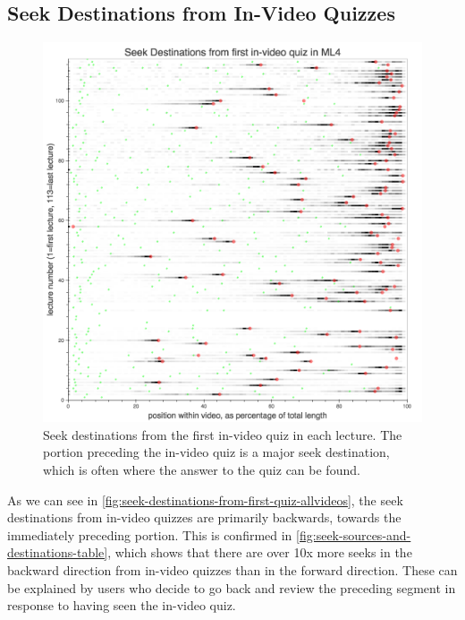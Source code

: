 \documentclass{sigchi}
\begin{document}
\pagebreak

\subsection{Seek Destinations from In-Video Quizzes}

\begin{figure}
\includegraphics[width=1.0\columnwidth]{seek-destinations-from-first-quiz-allvideos}
\caption{Seek destinations from the first in-video quiz in each lecture. The portion preceding the in-video quiz is a major seek destination, which is often where the answer to the quiz can be found.}
\label{fig:seek-destinations-from-first-quiz-allvideos}
\end{figure}

As we can see in \autoref{fig:seek-destinations-from-first-quiz-allvideos}, the seek destinations from in-video quizzes are primarily backwards, towards the immediately preceding portion. This is confirmed in \autoref{fig:seek-sources-and-destinations-table}, which shows that there are over 10x more seeks in the backward direction from in-video quizzes than in the forward direction. These can be explained by users who decide to go back and review the preceding segment in response to having seen the in-video quiz.

\end{document}
